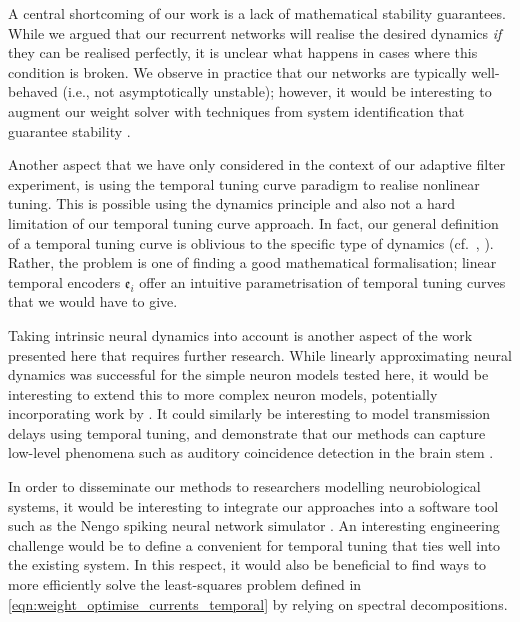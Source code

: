A central shortcoming of our work is a lack of mathematical stability guarantees.
While we argued that our recurrent networks will realise the desired dynamics \emph{if} they can be realised perfectly, it is unclear what happens in cases where this condition is broken.
We observe in practice that our networks are typically well-behaved (i.e., not asymptotically unstable); however, it would be interesting to augment our weight solver with techniques from system identification that guarantee stability \citep[cf.][]{verhaegen2007filtering}.

Another aspect that we have only considered in the context of our adaptive filter experiment, is using the temporal tuning curve paradigm to realise nonlinear tuning.
This is possible using the \NEF dynamics principle \citep[Chapter~8]{eliasmith2003neural} and also not a hard limitation of our temporal tuning curve approach.
In fact, our general definition of a temporal tuning curve is oblivious to the specific type of dynamics (cf.~, ).
Rather, the problem is one of finding a good mathematical formalisation; linear temporal encoders $\mathfrak{e}_i$ offer an intuitive parametrisation of temporal tuning curves that we would have to give.

Taking intrinsic neural dynamics into account is another aspect of the work presented here that requires further research.
While linearly approximating neural dynamics was successful for the simple neuron models tested here, it would be interesting to extend this to more complex neuron models, potentially incorporating work by \citet{duggins2017incorporating}.
It could similarly be interesting to model transmission delays using temporal tuning, and demonstrate that our methods can capture low-level phenomena such as auditory coincidence detection in the brain stem \citep[Chapter~31]{kandel2012principles}.

In order to disseminate our methods to researchers modelling neurobiological systems, it would be interesting to integrate our approaches into a software tool such as the Nengo spiking neural network simulator \citep{bekolay2014nengo}.
An interesting engineering challenge would be to define a convenient \API for temporal tuning that ties well into the existing system.
In this respect, it would also be beneficial to find ways to more efficiently solve the least-squares problem defined in \cref{eqn:weight_optimise_currents_temporal} by relying on spectral decompositions.
